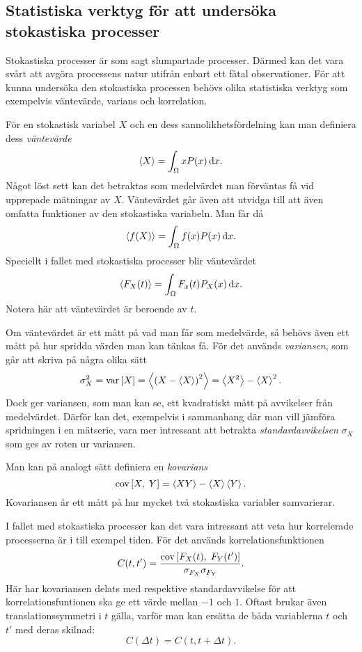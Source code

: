 \subsection{Statistiska verktyg för att undersöka stokastiska processer}
Stokastiska processer är som sagt slumpartade processer. Därmed kan
det vara svårt att avgöra processens natur utifrån enbart ett fåtal
observationer. För att kunna undersöka den stokastiska processen
behövs olika statistiska verktyg som exempelvis väntevärde, varians
och korrelation. 

För en stokastisk variabel $X$ och en dess sannolikhetsfördelning kan
man definiera dess \emph{väntevärde}
\begin{equation}
    \ev{X} = \int_{\Omega} x P(x) \id{x}.
\end{equation}
Något löst sett kan det betraktas som medelvärdet man förväntas få vid
upprepade mätningar av $X$. 
Väntevärdet går även att utvidga till att även omfatta funktioner av
den stokastiska variabeln. Man får då 
\begin{equation}
    \ev{f(X)} = \int_{\Omega} f(x) P(x) \id{x}.
\end{equation}
Speciellt i fallet med stokastiska processer blir väntevärdet 
\begin{equation}
    \ev{F_X(t)} = \int_{\Omega} F_x(t)P_X(x) \id{x}.
\end{equation}
Notera här att väntevärdet är beroende av $t$. 

Om väntevärdet är ett mått på vad man får som medelvärde, så behövs
även ett mått på hur spridda värden man kan tänkas få. För det används
\emph{variansen}, som går att skriva på några olika sätt
\begin{equation}
\sigma_X^2=\VAR{X} = \ev{\left(X-\ev{X} \right)^2} = \ev{X^2}-\ev{X}^2.
\end{equation}
Dock ger variansen, som man kan se, ett kvadratiskt mått på
avvikelser från medelvärdet. Därför kan det, exempelvis i sammanhang
där man vill jämföra spridningen i en mätserie, vara mer intressant
att betrakta \emph{standardavvikelsen} $\sigma_X$ som ges av roten ur
variansen.

Man kan på analogt sätt definiera en \emph{kovarians}
\begin{equation}
\COV{X}{Y}  = \ev{XY}-\ev{X}\ev{Y}.
\end{equation}
Kovariansen är ett mått på hur mycket två stokastiska variabler
samvarierar. 

I fallet med stokastiska processer kan det vara intressant att veta
hur korrelerade processerna är i till exempel tiden. För det används
korrelationsfunktionen 
\begin{equation}
C(t, t') = \frac{\text{cov}\left[F_X(t),\;F_Y(t')\right]}{\sigma_{F_X}\sigma_{F_Y}}.
\end{equation}
Här har kovariansen delats med respektive standardavvikelse för att
korrelationsfuntionen ska ge ett värde mellan 
$-1$ och $1$. 
Oftast brukar även translationssymmetri i $t$ gälla, varför man kan
ersätta de båda variablerna $t$ och $t'$ med deras skilnad:
\begin{equation}
C(\Delta t) = C(t, t+\Delta t).
\end{equation}


